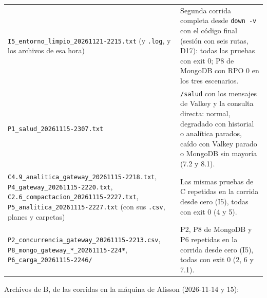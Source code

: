 \documentclass[10pt,letterpaper]{article}
\begin{document}
{\begin{longtable}{@{}p{}p{}@{}}
\texttt{I5\_entorno\_limpio\_20261121-2215.txt} (y \texttt{.log}, y los archivos de esa hora) & Segunda corrida completa desde \texttt{down -v} con el código final (sesión con seis rutas, D17): todas las pruebas con exit 0; P8 de MongoDB con RPO 0 en los tres escenarios. \\
\texttt{P1\_salud\_20261115-2307.txt} & \texttt{/salud} con los mensajes de Valkey y la consulta directa: normal, degradado con historial o analítica parados, caído con Valkey parado o MongoDB sin mayoría (7.2 y 8.1). \\
\texttt{C4.9\_analitica\_gateway\_20261115-2218.txt}, \texttt{P4\_gateway\_20261115-2220.txt}, \texttt{C2.6\_compactacion\_20261115-2227.txt}, \texttt{P5\_analitica\_20261115-2227.txt} (con sus \texttt{.csv}, planes y carpetas) & Las mismas pruebas de C repetidas en la corrida desde cero (I5), todas con exit 0 (4 y 5). \\
\texttt{P2\_concurrencia\_gateway\_20261115-2213.csv}, \texttt{P8\_mongo\_gateway\_*\_20261115-224*}, \texttt{P6\_carga\_20261115-2246/} & P2, P8 de MongoDB y P6 repetidas en la corrida desde cero (I5), todas con exit 0 (2, 6 y 7.1). \\
\bottomrule
\end{longtable}
}

Archivos de B, de las corridas en la máquina de Alisson (2026-11-14 y 15):
\end{document}
